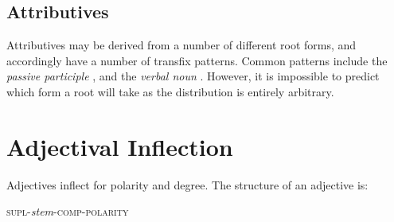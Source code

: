 \documentclass[grammar]{subfiles}
\begin{document}
%

  \subsection{Attributives}
  \label{ssec:am_attributives}

  Attributives may be derived from a number of different root forms, and accordingly have a number of transfix patterns. 
  Common patterns include the \emph{passive participle} , and the \emph{verbal noun} . 
  However, it is impossible to predict which form a root will take as the distribution is entirely arbitrary.

%
%


  \section{Adjectival Inflection}
  \label{sec:am_adjectival_inflection}

  Adjectives inflect for polarity and degree.  The structure of an adjective is:

  \begin{exe}
    \ex\label{ex:am_adjective_structure} \textsc{supl-}\textit{stem}\textsc{-comp-polarity}
  \end{exe}	
\end{document}
